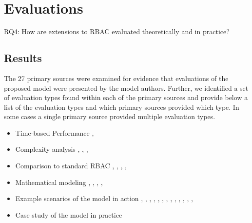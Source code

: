 
\section{Evaluations} \label{sec:evaluations}

RQ4: How are extensions to RBAC evaluated theoretically and in practice?

\subsection{Results}

The 27 primary sources were examined for evidence that evaluations of the proposed model were presented by the model authors.
Further, we identified a set of evaluation types found within  each of the primary sources and provide below a list of the 
evaluation types and which primary sources provided which type.  In some cases a single primary source provided multiple evaluation
types.

\begin{itemize}
\setlength{\itemsep}{0.25pt}
\item Time-based Performance \cite{ni2010privacy}, \cite{aich09:role}
\item Complexity analysis \cite{bao08:role}, \cite{zhang06:collaborative}, \cite{chen08:spatio-temporal}, \cite{aich09:role}
\item Comparison to standard RBAC \cite{bao08:role}, \cite{zou2009crbac}, \cite{zhang06:collaborative}, \cite{zhao2008flexible}, \cite{ray07:spatio}
\item Mathematical modeling \cite{damiani2007geo}, \cite{hansen2003spatial}, \cite{aich07:STARBAC}, \cite{chen08:spatio-temporal}, \cite{joshi05:generalized}
\item Example scenarios of the model in action \cite{alam06:constraint}, \cite{tzelepi01:flexible}, \cite{cholewka00:acontext-sensitive}, \cite{huang06:pervasive}, \cite{bao08:role}, \cite{jian2008extended}, \cite{yamazaki04:designing}, \cite{zou2009crbac}, \cite{ray07:spatio}, \cite{samuel07:spatio-temporal}, \cite{joshi05:generalized}, \cite{yao2008task}, \cite{zhou2007team}, \cite{oh2003task}
\item Case study of the model in practice \cite{motta03:contextual}
\end{itemize}

